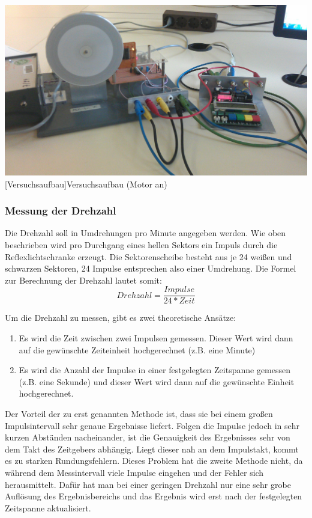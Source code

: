 \documentclass[12pt,a4paper,bibliography=totocnumbered,listof=totocnumbered]{scrartcl}
\begin{document}
\vspace{1em}
\begin{minipage}{\linewidth}
	\centering
	\includegraphics[width=0.7\linewidth]{img/MotorAufbau.jpg}
	[Versuchsaufbau]{Versuchsaufbau (Motor an)}
	\label{fig:MotorAufbau}
\end{minipage}

\subsubsection{Messung der Drehzahl}
Die Drehzahl soll in Umdrehungen pro Minute angegeben werden. Wie oben beschrieben wird pro Durchgang eines hellen Sektors ein Impuls durch die Reflexlichtschranke erzeugt. Die Sektorenscheibe besteht aus je 24 weißen und schwarzen Sektoren, 24 Impulse entsprechen also einer Umdrehung. Die Formel zur Berechnung der Drehzahl lautet somit: 
\[ Drehzahl = \frac{Impulse}{24*Zeit}  \]

Um die Drehzahl zu messen, gibt es zwei theoretische Ansätze:
\begin{enumerate}
	\item Es wird die Zeit zwischen zwei Impulsen gemessen. Dieser Wert wird dann auf die gewünschte Zeiteinheit hochgerechnet (z.B. eine Minute)
	\item Es wird die Anzahl der Impulse in einer festgelegten Zeitspanne gemessen (z.B. eine Sekunde) und dieser Wert wird dann auf die gewünschte Einheit hochgerechnet.
\end{enumerate}

Der Vorteil der zu erst genannten Methode ist, dass sie bei einem großen Impulsintervall sehr genaue Ergebnisse liefert. Folgen die Impulse jedoch in sehr kurzen Abständen nacheinander, ist die Genauigkeit des Ergebnisses sehr von dem Takt des Zeitgebers abhängig. Liegt dieser nah an dem Impulstakt, kommt es zu starken Rundungsfehlern. Dieses Problem hat die zweite Methode nicht, da während dem Messintervall viele Impulse eingehen und der Fehler sich herausmittelt. Dafür hat man bei einer geringen Drehzahl nur eine sehr grobe Auflösung des Ergebnisbereichs und das Ergebnis wird erst nach der festgelegten Zeitspanne aktualisiert. 
\end{document}
